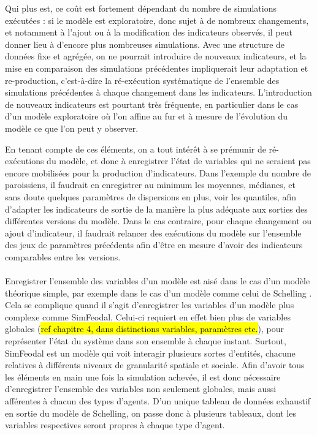 Qui plus est, ce coût est fortement dépendant du nombre de simulations exécutées : si le modèle est exploratoire, donc sujet à de nombreux changements, et notamment à l'ajout ou à la modification des indicateurs observés, il peut donner lieu à d'encore plus nombreuses simulations.
Avec une structure de données fixe et agrégée, on ne pourrait introduire de nouveaux indicateurs, et la mise en comparaison des simulations précédentes impliquerait leur adaptation et re-production, c'est-à-dire la ré-exécution systématique de l'ensemble des simulations précédentes à chaque changement dans les indicateurs.
L'introduction de nouveaux indicateurs est pourtant très fréquente, en particulier dans le cas d'un modèle exploratoire où l'on affine au fur et à mesure de l'évolution du modèle ce que l'on peut y observer.

En tenant compte de ces éléments, on a tout intérêt à se prémunir de ré-exécutions du modèle, et donc à enregistrer l'état de variables qui ne seraient pas encore mobilisées pour la production d'indicateurs.	
Dans l'exemple du nombre de paroissiens, il faudrait en enregistrer au minimum les moyennes, médianes, et sans doute quelques paramètres de dispersions en plus, voir les quantiles, afin d'adapter les indicateurs de sortie de la manière la plus adéquate aux sorties des différentes versions du modèle.
Dans le cas contraire, pour chaque changement ou ajout d'indicateur, il faudrait relancer des exécutions du modèle sur l'ensemble des jeux de paramètres précédents afin d'être en mesure d'avoir des indicateurs comparables entre les versions.

\medskip
\paragraph[Conclusion intermédiaire]{}
Enregistrer l'ensemble des variables d'un modèle est aisé dans le cas d'un modèle théorique simple, par exemple dans le cas d'un modèle comme celui de Schelling \autocite{schelling_dynamic_1971}.
Cela se complique quand il s'agit d'enregistrer les variables d'un modèle plus complexe comme SimFeodal.
Celui-ci requiert en effet bien plus de variables globales (\hl{ref chapitre 4, dans distinctions variables, paramètres etc.}), pour représenter l'état du système dans son ensemble à chaque instant.
Surtout, SimFeodal est un modèle qui voit interagir plusieurs sortes d'entités, chacune relatives à différents niveaux de granularité spatiale et sociale.
Afin d'avoir tous les éléments en main une fois la simulation achevée, il est donc nécessaire d'enregistrer l'ensemble des variables non seulement globales, mais aussi afférentes à chacun des types d'agents.
D'un unique tableau de données exhaustif en sortie du modèle de Schelling, on passe donc à plusieurs tableaux, dont les variables respectives seront propres à chaque type d'agent.

